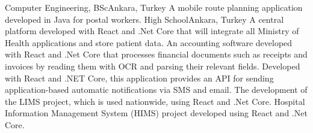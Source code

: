 \documentclass[
    10pt,
    A4,
    english,
    draft = false,
    twoside = false,
]{article}
\begin{document}

	{Computer Engineering, BSc}{Ankara, Turkey}
    {
      {A mobile route planning application developed in Java for postal workers.}
    }
	{High School}{Ankara, Turkey}{}
    {
      {A central platform developed with React and .Net Core that will integrate all Ministry of Health applications and store patient data.}
      {An accounting software developed with React and .Net Core that processes financial documents such as receipts and invoices by reading them with OCR and parsing their relevant fields.}
      {Developed with React and .NET Core, this application provides an API for sending application-based automatic notifications via SMS and email.}
    }
    {
      {The development of the LIMS project, which is used nationwide, using React and .Net Core.}
      {Hospital Information Management System (HIMS) project developed using React and .Net Core.}
    }
\end{document}
